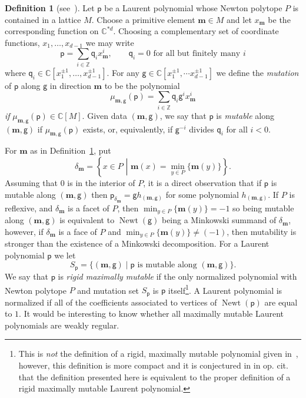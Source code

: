 \documentclass[10pt]{amsart}
\numberwithin{equation}{section}
\theoremstyle{plain}
\theoremstyle{definition}
\newtheorem{definition}[theorem]{Definition}
\theoremstyle{remark}
\DeclareMathOperator{\Newt}{Newt}
\begin{document}
\begin{definition}[see~\cite{akhtar2012minkowski}]\label{definition:mut}
  Let \(\mathsf{p}\) be a Laurent polynomial whose Newton polytope \(P\) is contained in a lattice \(M\). Choose a primitive element \({\mathbf{m}} \in M\) and let \(x_{\mathbf{m}}\) be the corresponding function on \(\mathbb{C}^{*d}\). Choosing a complementary set of coordinate functions, \(x_1,\dots, x_{d-1}\) we may write
  \[
    \mathsf{p} = \sum_{i\in \mathbb{Z}} \mathsf{q}_i x_{\mathbf{m}}^i,\qquad \mathsf{q}_i = 0 \text{ for all but finitely many } i
  \]
  where \(\mathsf{q}_i \in \mathbb{C}[x_1^{\pm 1},\dots, x_{d-1}^{\pm 1}]\). For any \(\mathsf{g} \in \mathbb{C}[x_1^{\pm 1},\dotsm x_{d-1}^{\pm 1}]\) we define the \emph{mutation} of \(\mathsf{p}\) along \(\mathsf{g}\) in direction \({\mathbf{m}}\) to be the polynomial
  \[
    \mu_{{\mathbf{m}},\mathsf{g}}(\mathsf{p}) = \sum_{i \in \mathbb{Z}} \mathsf{q}_i\mathsf{g}^i x_{\mathbf{m}}^i
  \]
  \emph{if} \(\mu_{{\mathbf{m}},\mathsf{g}}(\mathsf{p}) \in \mathbb{C}[M]\). Given data \(({\mathbf{m}},\mathsf{g})\), we say that \(\mathsf{p}\) is \emph{mutable} along \(({\mathbf{m}},\mathsf{g})\) if \(\mu_{{\mathbf{m}},\mathsf{g}}(\mathsf{p})\) exists, or, equivalently, if \(\mathsf{g}^{-i}\) divides \(\mathsf{q}_i\) for all \(i < 0\).
\end{definition}

\noindent  For \({\mathbf{m}}\) as in Definition~\ref{definition:mut}, put
\[
  \delta_{\mathbf{m}} = \left\{ x \in P \,\, \left| \,\, {\mathbf{m}}(x) = \min_{y \in P}\{{\mathbf{m}}(y)\}\right.\right\}.
\]
Assuming that \(0\) is in the interior of \(P\), it is a direct observation that if \(\mathsf{p}\) is mutable along \(({\mathbf{m}},\mathsf{g})\) then \(\mathsf{p}_{\delta_{\mathbf{m}}} = \mathsf{g} h_{({\mathbf{m}},\mathsf{g})}\) for some polynomial \(h_{({\mathbf{m}},\mathsf{g})}\). If \(P\) is reflexive, and \(\delta_{\mathbf{m}}\) is a facet of \(P\), then \(\min_{y \in P}\{{\mathbf{m}}(y)\}=-1\) so being mutable along \(({\mathbf{m}},\mathsf{g})\) is equivalent to \(\Newt(\mathsf{g})\) being a Minkowski summand of \(\delta_{\mathbf{m}}\), however, if \(\delta_{\mathbf{m}}\) is a face of \(P\) and \(\min_{y \in P}\{{\mathbf{m}}(y)\}\neq (-1)\), then mutability is stronger than the existence of a Minkowski decomposition. For a Laurent polynomial \(\mathsf{p}\) we let
\[
  S_\mathsf{p} = \{ ({\mathbf{m}},\mathsf{g}) \mid \mathsf{p} \text{ is mutable along } ({\mathbf{m}},\mathsf{g})\}.
\]
We say that \(\mathsf{p}\) is \emph{rigid maximally mutable} if the only normalized polynomial with Newton polytope \(P\) and mutation set \(S_\mathsf{p}\) is \(\mathsf{p}\) itself\footnote{This is \emph{not} the definition of a rigid, maximally mutable polynomial given in~\cite{coates2021maximally}, however, this definition is more compact and it is conjectured in in {op. cit.} that the definition presented here is equivalent to the proper definition of a rigid maximally mutable Laurent polynomial.}. A Laurent polynomial is normalized if all of the coefficients associated to vertices of \(\Newt(\mathsf{p})\) are equal to \(1\). It would be interesting to know whether all maximally mutable Laurent polynomials are weakly regular.
\end{document}
